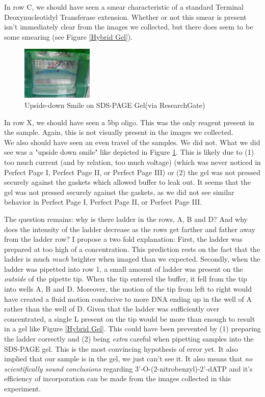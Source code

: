 \documentclass[letterpaper]{article}
\newcommand{\tdt}{Terminal Deoxynucleotidyl Transferase}
\newcommand{\uL}{\micro{}L}
\newcommand{\BdATP}{3'-O-(2-nitrobenzyl)-2'-dATP}
\begin{document}
In row C, we should have seen a smear characteristic of a standard \tdt{} extension. Whether or not this smear is present isn't immediately clear from the images we collected, but there does seem to be some smearing (see Figure \ref{Hybrid Gel}).

\begin{figure}
\centering
\includegraphics[height=1in]{smiling.png}
\caption{Upside-down Smile on SDS-PAGE Gel{\small (via ResearchGate)}}
\label{Upside-down Smile}
\end{figure}

In row X, we should have seen a 5bp oligo. This was the only reagent present in the sample. Again, this is not visually present in the images we collected.\\

We also should have seen an even travel of the samples. We did not. What we did see was a "upside down smile" like depicted in Figure \ref{Upside-down Smile}. This is likely due to (1) too much current (and by relation, too much voltage) (which was never noticed in Perfect Page I, Perfect Page II, or Perfect Page III) or (2) the gel was not pressed securely against the gaskets which allowed buffer to leak out\cite{smileSDS}. It seems that the gel was not pressed securely against the gaskets, as we did not see similar behavior in Perfect Page I, Perfect Page II, or Perfect Page III. 

The question remains: why is there ladder in the rows, A, B and D? And why does the intensity of the ladder decrease as the rows get farther and father away from the ladder row? I propose a two fold explanation: First, the ladder was prepared at too high of a concentration. This prediction rests on the fact that the ladder is much \textit{much} brighter when imaged than we expected. Secondly, when the ladder was pipetted into row 1, a small amount of ladder was present on the \textit{outside} of the pipette tip. When the tip entered the buffer, it fell from the tip into wells A, B and D. Moreover, the motion of the tip from left to right would have created a fluid motion conducive to more DNA ending up in the well of A rather than the well of D. Given that the ladder was sufficiently over concentrated, a single \uL{} present on the tip would be more than enough to result in a gel like Figure \ref{Hybrid Gel}. This could have been prevented by (1) preparing the ladder correctly and (2) being \textit{extra} careful when pipetting samples into the SDS-PAGE gel. This is the most convincing hypothesis of error yet. It also implied that our sample is in the gel, we just can't see it. It also means that \textit{no scientifically sound conclusions} regarding \BdATP{} and it's efficiency of incorporation can be made from the images collected in this experiment.
\end{document}
